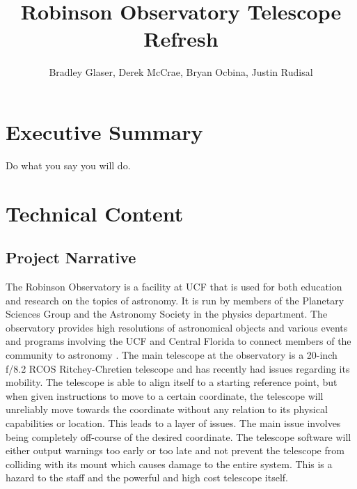 \documentclass[12pt]{report}
\title{Robinson Observatory Telescope Refresh}
\author{Bradley Glaser, Derek McCrae, Bryan Ocbina, Justin Rudisal}
\begin{document}
\maketitle

\begin{abstract}
\end{abstract}

\section*{Executive Summary}
Do what you say you will do.\cite{heinrich}

\section*{Technical Content}

\subsection*{Project Narrative}

The Robinson Observatory is a facility at UCF that is used for both education and research on the topics of astronomy.  It is run by members of the Planetary Sciences Group and the Astronomy Society in the physics department.  The observatory provides high resolutions of astronomical objects and various events and programs involving the UCF and Central Florida to connect members of the community to astronomy .  The main telescope at the observatory is a 20-inch f/8.2 RCOS Ritchey-Chretien telescope and has recently had issues regarding its mobility.  The telescope is able to align itself to a starting reference point, but when given instructions to move to a certain coordinate, the telescope will unreliably move towards the coordinate without any relation to its physical capabilities or location.  This leads to a layer of issues.  The main issue involves being completely off-course of the desired coordinate.  The telescope software will either output warnings too early or too late and not prevent the telescope from colliding with its mount which causes damage to the entire system.  This is a hazard to the staff and the powerful and high cost telescope itself.
\end{document}
